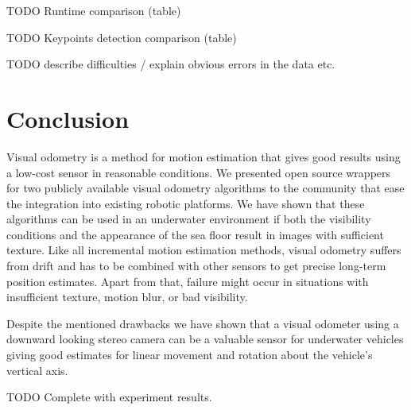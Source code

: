 \documentclass[conference]{IEEEtran}
\begin{document}
TODO Runtime comparison (table)

TODO Keypoints detection comparison (table)

TODO describe difficulties / explain obvious errors in the data etc.


\section{Conclusion
  \label{conclusion}
}

Visual odometry is a method for motion estimation that gives good results using a low-cost sensor in reasonable conditions. We presented open source wrappers for two publicly available visual odometry algorithms to the community that ease the integration into existing robotic platforms.
We have shown that these algorithms can be used in an underwater environment if both the visibility conditions and the appearance of the sea floor result in images with sufficient texture. Like all incremental motion estimation methods, visual odometry suffers from drift and has to be combined with other sensors to get precise long-term position estimates. Apart from that, failure might occur in situations with insufficient texture, motion blur, or bad visibility.

Despite the mentioned drawbacks we have shown that a visual odometer using a downward looking stereo camera can be a valuable sensor for underwater vehicles giving good estimates for linear movement and rotation about the vehicle's vertical axis.

TODO Complete with experiment results.




\end{document}
